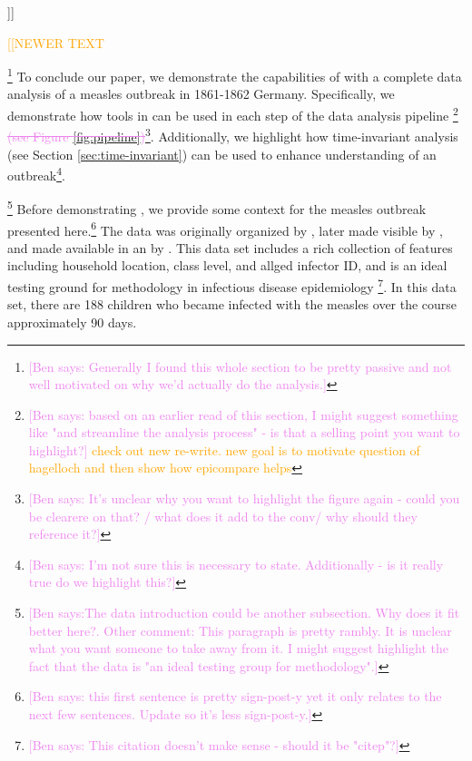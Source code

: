 \documentclass[
  shortnames]{jss}
\begin{document}
{]}{]}

\textcolor{orange}{[[NEWER TEXT}

\footnote{\textcolor{violet}{[Ben says: Generally I found this whole section to be pretty passive and not well motivated on why we'd actually do the analysis.]}}
To conclude our paper, we demonstrate the capabilities of
 with a complete data analysis of a measles outbreak in
1861-1862 Germany. Specifically, we demonstrate how tools in
 can be used in each step of the data analysis pipeline
\footnote{\textcolor{violet}{[Ben says: based on an earlier read of this section, I might suggest something like "and streamline the analysis process" - is that a selling point you want to highlight?]} \textcolor{orange}{check out new re-write.  new goal is to motivate question of hagelloch and then show how epicompare helps}}
\textcolor{violet}{\sout{(see Figure \ref{fig:pipeline})}}\footnote{\textcolor{violet}{[Ben says: It's unclear why you want to highlight the figure again - could you be clearere on that? / what does it add to the conv/ why should they reference it?]}}.
Additionally, we highlight how time-invariant analysis (see Section
\ref{sec:time-invariant}) can be used to enhance understanding of an
outbreak\footnote{\textcolor{violet}{[Ben says: I'm not sure this is necessary to state. Additionally - is it really true do we highlight this?]}}.

\footnote{\textcolor{violet}{[Ben says:The data introduction could be another subsection. Why does it fit better here?.   Other comment: This paragraph is pretty rambly. It is unclear what you want someone to take away from it. I might suggest highlight the fact that the data is "an ideal testing group for methodology".]}}
Before demonstrating , we provide some context for the
measles outbreak presented
here.\footnote{\textcolor{violet}{[Ben says: this first sentence is pretty sign-post-y yet it only relates to the next few sentences. Update so it's less sign-post-y.]}}
The data was originally organized by \cite{pfeilsticker1863}, later made
visible by \cite{oesterle1992}, and made available in an  by
\cite{surveillance2017}. This data set includes a rich collection of
features including household location, class level, and allged infector
ID, and is an ideal testing ground for methodology in infectious disease
epidemiology
\cite{Neal2004,britton2011,groendyke2012,becker2016}\footnote{\textcolor{violet}{[Ben says: This citation doesn't make sense - should it be "citep"?]}}.
In this data set, there are 188 children who became infected with the
measles over the course approximately 90 days.
\end{document}
